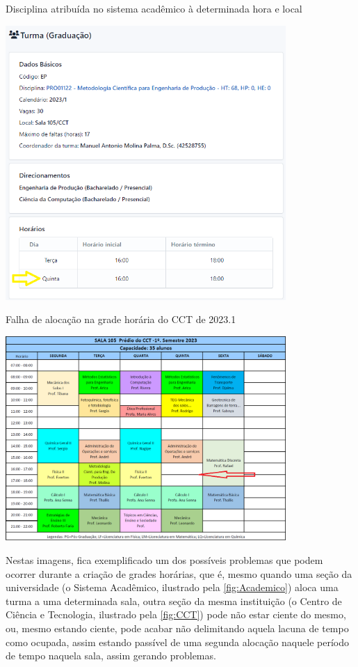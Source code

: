 \begin{MyCenteredFigure} \caption{Disciplina atribuída no sistema acadêmico à determinada hora e local} \label{fig:Academico}
  \includegraphics[width=0.8\textwidth]{files/img/2.02!2-marco/Metodologia-Quinta}
\end{MyCenteredFigure}

\begin{MyCenteredFigure} \caption{Falha de alocação na grade horária do CCT de 2023.1} \label{fig:CCT}
  \includegraphics[width=0.8\textwidth]{files/img/2.02!2-marco/Aulas-CCT-105-2023_1}
\end{MyCenteredFigure}

Nestas imagens, fica exemplificado um dos possíveis problemas que podem ocorrer durante a criação de grades horárias, que é, mesmo quando uma seção da universidade (o Sistema Acadêmico, ilustrado pela \autoref{fig:Academico}) aloca uma turma a uma determinada sala, outra seção da mesma instituição (o Centro de Ciência e Tecnologia, ilustrado pela \autoref{fig:CCT}) pode não estar ciente do mesmo, ou, mesmo estando ciente, pode acabar não delimitando aquela lacuna de tempo como ocupada, assim estando passível de uma segunda alocação naquele período de tempo naquela sala, assim gerando problemas.

